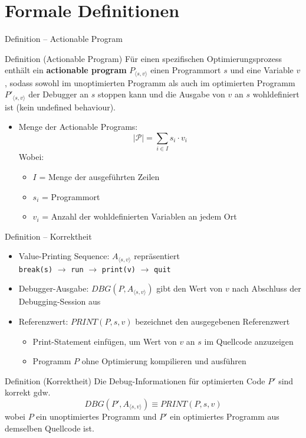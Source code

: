 ﻿\documentclass{beamer}
\begin{document}
\section{Formale Definitionen}


\begin{frame}{Definition -- Actionable Program}
  \begin{block}{Definition (Actionable Program)}
    F\"ur einen spezifischen Optimierungsprozess enth\"alt ein \textbf{actionable program}
    $P_{\langle s,v\rangle}$ einen Programmort $s$ und eine Variable $v$, sodass sowohl
    im unoptimierten Programm als auch im optimierten Programm $P'_{\langle s,v\rangle}$ der Debugger an $s$ stoppen
    kann und die Ausgabe von $v$ an $s$ wohldefiniert ist (kein undefined behaviour).
  \end{block}
  \vspace{0.2cm}
  \begin{itemize}
    \item Menge der Actionable Programs:
      \[
        |\mathcal{P}| = \sum_{i \in I} s_i \cdot v_i
      \]
      Wobei:
      \begin{itemize}
        \item $I$ = Menge der ausgef\"uhrten Zeilen
        \item $s_i$ = Programmort
        \item $v_i$ = Anzahl der wohldefinierten Variablen an jedem Ort
      \end{itemize}
  \end{itemize}
\end{frame}


\begin{frame}{Definition -- Korrektheit}
  \begin{itemize}
    \item Value-Printing Sequence: $A_{\langle s,v\rangle}$ repr\"asentiert \\
      \texttt{break(s)} $\rightarrow$ \texttt{run} $\rightarrow$ \texttt{print(v)} $\rightarrow$ \texttt{quit}
    \item Debugger-Ausgabe: $\mathit{DBG}(P, A_{\langle s,v\rangle})$ gibt den Wert von $v$ nach Abschluss der Debugging-Session aus
    \item Referenzwert: $\mathit{PRINT}(P, s, v)$ bezeichnet den ausgegebenen Referenzwert
      \begin{itemize}
        \item Print-Statement einf\"ugen, um Wert von $v$ an $s$ im Quellcode anzuzeigen
        \item Programm $P$ ohne Optimierung kompilieren und ausf\"uhren
      \end{itemize}
  \end{itemize}
  \vspace{0.3cm}
  \begin{block}{Definition (Korrektheit)}
    Die Debug-Informationen f\"ur optimierten Code $P'$ sind korrekt gdw.
    \[
      \mathit{DBG}(P', A_{\langle s,v\rangle}) \equiv \mathit{PRINT}(P, s, v)
    \]
    wobei $P$ ein unoptimiertes Programm und $P'$ ein optimiertes Programm aus demselben Quellcode ist.
  \end{block}
\end{frame}
\end{document}
